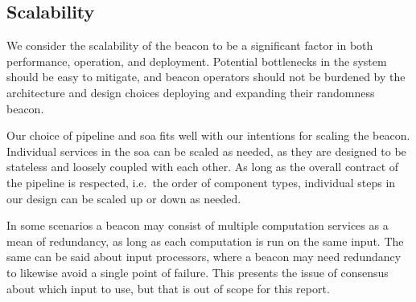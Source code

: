 \subsection{Scalability}
We consider the scalability of the beacon to be a significant factor in both performance, operation, and deployment.
Potential bottlenecks in the system should be easy to mitigate, and beacon operators should not be burdened by the architecture and design choices deploying and expanding their randomness beacon.

Our choice of pipeline and \gls{soa} fits well with our intentions for scaling the beacon.
Individual services in the \gls{soa} can be scaled as needed, as they are designed to be stateless and loosely coupled with each other.
As long as the overall contract of the pipeline is respected, i.e.\ the order of component types, individual steps in our design can be scaled up or down as needed.

In some scenarios a beacon may consist of multiple computation services as a mean of redundancy, as long as each computation is run on the same input.
The same can be said about input processors, where a beacon may need redundancy to likewise avoid a single point of failure.
This presents the issue of consensus about which input to use, but that is out of scope for this report.

